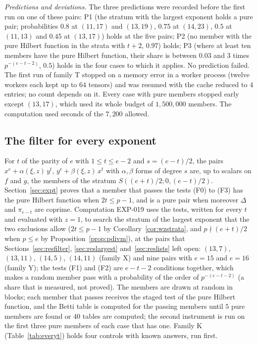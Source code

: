 \documentclass[11pt]{article}
\theoremstyle{definition}
\theoremstyle{remark}
\newcommand{\EXP}[1]{\mbox{EXP-#1}}
\begin{document}
\emph{Predictions and deviations.} The three predictions were recorded before the first run on one of these pairs: P1 (the stratum with the largest exponent holds a pure pair; probabilities $0.8$ at $(11,17)$ and $(13,19)$, $0.75$ at $(14,23)$, $0.5$ at $(11,13)$ and $0.45$ at $(13,17)$) holds at the five pairs; P2 (no member with the pure Hilbert function in the strata with $t+2$, $0.97$) holds; P3 (where at least ten members have the pure Hilbert function, their share is between $0.03$ and $3$ times $p^{-(e-t-2)}$, $0.5$) holds in the four cases to which it applies. No prediction failed. The first run of family T stopped on a memory error in a worker process (twelve workers each kept up to $64$ tensors) and was resumed with the cache reduced to $4$ entries; no count depends on it. Every case with pure members stopped early except $(13,17)$, which used its whole budget of $1{,}500{,}000$ members. The computation used \nlgsSeconds{} seconds of the $7{,}200$ allowed.


\subsection{The filter for every exponent}
\label{sec:resevery}

For $t$ of the parity of $e$ with $1\le t\le e-2$ and $s=(e-t)/2$, the pairs $x^e+\alpha(\xi,z)\,y^t$, $y^e+\beta(\xi,z)\,x^t$ with $\alpha,\beta$ forms of degree $s$ are, up to scalars on $f$ and $g$, the members of the stratum $S((e+t)/2;0,(e-t)/2)$. Section~\ref{sec:expt} proves that a member that passes the tests (F0) to (F3) has the pure Hilbert function when $2t\le p-1$, and is a pure pair when moreover $\Delta$ and $\pi_{e-t}$ are coprime. Computation \EXP{019} uses the tests, written for every $t$ and evaluated with $z=1$, to search the stratum of the largest exponent that the two exclusions allow ($2t\le p-1$ by Corollary~\ref{cor:wzstrata}, and $p\nmid(e+t)/2$ when $p\le e$ by Proposition~\ref{prop:pdivm}), at the pairs that Sections~\ref{sec:resfilter}, \ref{sec:reslargest} and~\ref{sec:reslists} left open: $(13,7)$, $(13,11)$, $(14,5)$, $(14,11)$ (family X) and nine pairs with $e=15$ and $e=16$ (family Y); the tests (F1) and (F2) are $e-t-2$ conditions together, which makes a random member pass with a probability of the order of $p^{-(e-t-2)}$ (a share that is measured, not proved). The members are drawn at random in blocks; each member that passes receives the staged test of the pure Hilbert function, and the Betti table is computed for the passing members until $5$ pure members are found or $40$ tables are computed; the second instrument is run on the first three pure members of each case that has one. Family K (Table~\ref{tab:everyt}) holds four controls with known answers, run first.
\end{document}
